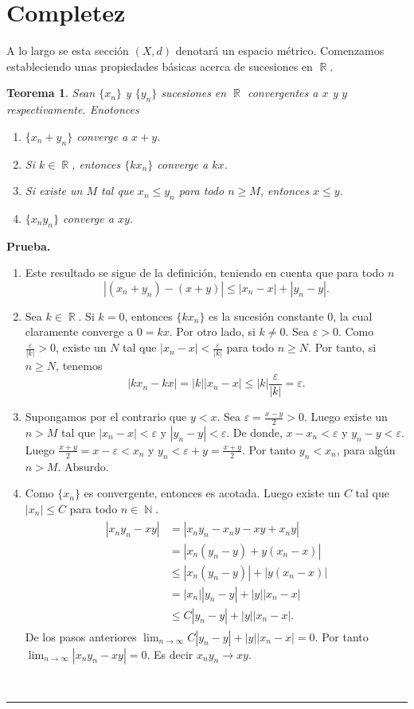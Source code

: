 \documentclass[x11names, 12pt]{book}
\newtheorem{teorema}{Teorema}
\newenvironment{prueba}[1][Prueba]{\noindent\textbf{#1.} }{\ \rule{0.5em}{0.5em}}
\DeclareMathOperator{\ene}{\mathbb{N}}
\DeclareMathOperator{\R}{\mathbb{R}}
\begin{document}
\section{Completez}
A lo largo se esta sección $(X,d)$ denotará un espacio métrico.
Comenzamos estableciendo unas propiedades básicas acerca de sucesiones en $\R$.

\begin{teorema}\label{pro-basi-suces}
Sean $\{x_n\}$ y $\{y_n\}$ sucesiones en $\R$ convergentes a $x$ y $y$ respectivamente. Enotonces
\begin{enumerate}
    \item $\{x_n+y_n\}$ converge a $x+y$.
    \item Si $k\in \R$, entonces $\{k x_n\}$ converge a $kx$.
    \item Si existe un $M$ tal que $x_n \leq y_n$ para todo $n\geq M$, entonces $x\leq y$.  
        \item $\{x_ny_n\}$ converge a $xy$.
\end{enumerate}
\end{teorema}
\begin{prueba}
\begin{enumerate}
    \item Este resultado se sigue de la definición, teniendo en cuenta que para todo $n$
    \[|(x_n+y_n)-(x+y)|\leq|x_n-x|+|y_n-y|.\]
    \item Sea $k\in \R$. Si $k=0$, entonces $\{k x_n\}$ es la sucesión constante $0$, la cual claramente converge a $0=kx$. Por otro lado, si $k\neq 0$. Sea $\varepsilon >0$. Como $\frac{\varepsilon}{|k|}>0$, existe un $N$ tal que $|x_n-x|<\frac{\varepsilon}{|k|}$ para todo $n\geq N$. Por tanto, si $n\geq N$, tenemos
    \[|kx_n-kx|=|k||x_n-x|\leq |k|\frac{\varepsilon}{|k|}=\varepsilon.\]
    \item Supongamos por el contrario que $y<x$. Sea $\varepsilon=\frac{x-y}{2}>0.$ Luego existe un $n>M$ tal que $|x_n-x|<\varepsilon$ y  $|y_n-y|<\varepsilon$. De donde,
    $x-x_n<\varepsilon$ y $y_n-y<\varepsilon$. Luego $\frac{x+y}{2}=x-\varepsilon<x_n$ y $y_n<\varepsilon+y=\frac{x+y}{2}$. Por tanto $y_n<x_n$, para algún $n>M$. Absurdo.
    \item Como $\{x_n\}$ es convergente, entonces es acotada. Luego existe un $C$ tal que $|x_n|\leq C$ para todo $n\in  \ene.$
    \begin{eqnarray*}
    \begin{split}
    |x_ny_n-xy|& =|x_ny_n-x_ny-xy+x_ny| \\
    & = |x_n(y_n-y)+y(x_n-x)| \\
    & \leq |x_n(y_n-y)|+|y(x_n-x)|\\
    &=|x_n||y_n-y|+|y||x_n-x|\\
    &\leq C|y_n-y|+|y||x_n-x|.
    \end{split}
     \end{eqnarray*}
        De los pasos anteriores $\lim_{n\to \infty}C|y_n-y|+|y||x_n-x|=0 .$ Por tanto $\lim_{n\to \infty}|x_ny_n-xy|=0.$
    Es decir $x_ny_n\to xy.$
\end{enumerate}
\end{prueba}
\end{document}
